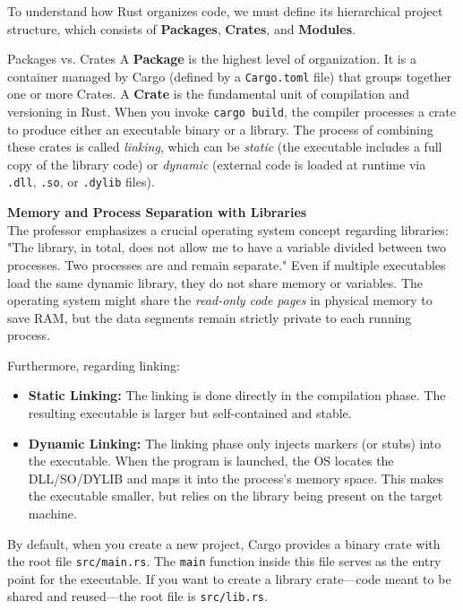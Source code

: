 To understand how Rust organizes code, we must define its hierarchical project structure, which consists of \textbf{Packages}, \textbf{Crates}, and \textbf{Modules}.

\begin{insightbox}{Packages vs. Crates}
A \textbf{Package} is the highest level of organization. It is a container managed by Cargo (defined by a \texttt{Cargo.toml} file) that groups together one or more Crates. 
A \textbf{Crate} is the fundamental unit of compilation and versioning in Rust. When you invoke \texttt{cargo build}, the compiler processes a crate to produce either an executable binary or a library. The process of combining these crates is called \textit{linking}, which can be \textit{static} (the executable includes a full copy of the library code) or \textit{dynamic} (external code is loaded at runtime via \texttt{.dll}, \texttt{.so}, or \texttt{.dylib} files).
\end{insightbox}

\begin{memoryblock}
\textbf{Memory and Process Separation with Libraries}\\
The professor emphasizes a crucial operating system concept regarding libraries: "The library, in total, does not allow me to have a variable divided between two processes. Two processes are and remain separate." Even if multiple executables load the same dynamic library, they do not share memory or variables. The operating system might share the \textit{read-only code pages} in physical memory to save RAM, but the data segments remain strictly private to each running process. 

Furthermore, regarding linking:
\begin{itemize}
    \item \textbf{Static Linking:} The linking is done directly in the compilation phase. The resulting executable is larger but self-contained and stable.
    \item \textbf{Dynamic Linking:} The linking phase only injects markers (or stubs) into the executable. When the program is launched, the OS locates the DLL/SO/DYLIB and maps it into the process's memory space. This makes the executable smaller, but relies on the library being present on the target machine.
\end{itemize}
\end{memoryblock}

By default, when you create a new project, Cargo provides a binary crate with the root file \texttt{src/main.rs}. The \texttt{main} function inside this file serves as the entry point for the executable. If you want to create a library crate---code meant to be shared and reused---the root file is \texttt{src/lib.rs}. 

